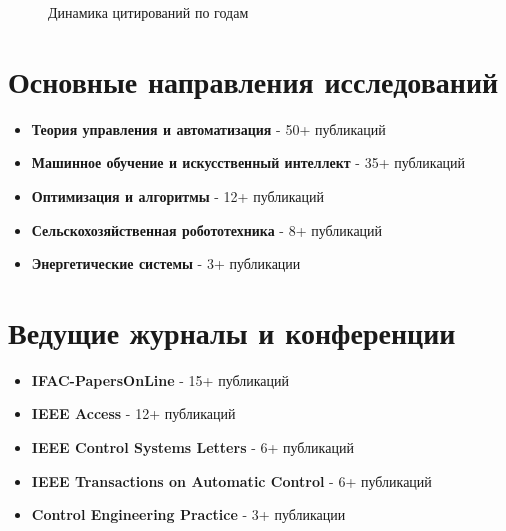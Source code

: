 \documentclass{article}
\begin{document}
\begin{figure}[h]
\centering
{}
\caption{Динамика цитирований по годам}
\end{figure}

\section*{Основные направления исследований}

\begin{itemize}
\item \textbf{Теория управления и автоматизация} - 50+ публикаций
\item \textbf{Машинное обучение и искусственный интеллект} - 35+ публикаций
\item \textbf{Оптимизация и алгоритмы} - 12+ публикаций
\item \textbf{Сельскохозяйственная робототехника} - 8+ публикаций
\item \textbf{Энергетические системы} - 3+ публикации
\end{itemize}

\section*{Ведущие журналы и конференции}

\begin{itemize}
\item \textbf{IFAC-PapersOnLine} - 15+ публикаций
\item \textbf{IEEE Access} - 12+ публикаций
\item \textbf{IEEE Control Systems Letters} - 6+ публикаций
\item \textbf{IEEE Transactions on Automatic Control} - 6+ публикаций
\item \textbf{Control Engineering Practice} - 3+ публикации
\end{itemize}

\vspace{1cm}

\renewcommand{\bibsection}{\section*{Публикации}}


\nocite{*}


\end{document}
